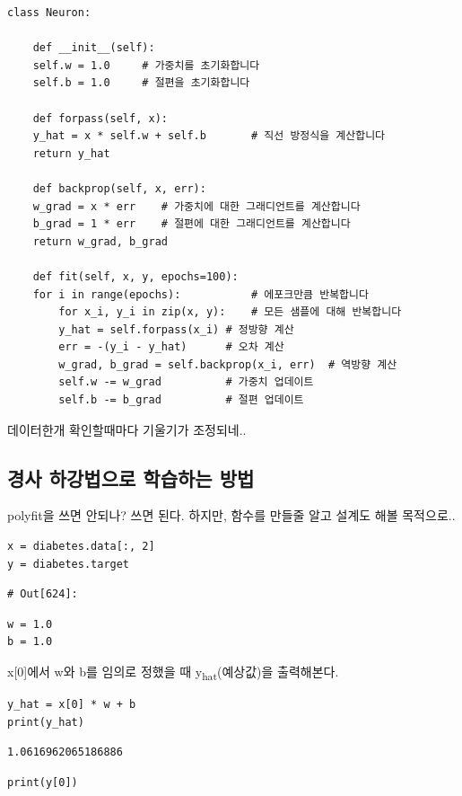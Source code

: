 \documentclass[11pt]{article}
\begin{document}
\begin{enumerate}
\begin{verbatim}
class Neuron:

    def __init__(self):
	self.w = 1.0     # 가중치를 초기화합니다
	self.b = 1.0     # 절편을 초기화합니다

    def forpass(self, x):
	y_hat = x * self.w + self.b       # 직선 방정식을 계산합니다
	return y_hat

    def backprop(self, x, err):
	w_grad = x * err    # 가중치에 대한 그래디언트를 계산합니다
	b_grad = 1 * err    # 절편에 대한 그래디언트를 계산합니다
	return w_grad, b_grad

    def fit(self, x, y, epochs=100):
	for i in range(epochs):           # 에포크만큼 반복합니다
	    for x_i, y_i in zip(x, y):    # 모든 샘플에 대해 반복합니다
		y_hat = self.forpass(x_i) # 정방향 계산
		err = -(y_i - y_hat)      # 오차 계산
		w_grad, b_grad = self.backprop(x_i, err)  # 역방향 계산
		self.w -= w_grad          # 가중치 업데이트
		self.b -= b_grad          # 절편 업데이트
\end{verbatim}

데이터한개 확인할때마다 기울기가 조정되네..
\end{enumerate}

\subsection{경사 하강법으로 학습하는 방법}
\label{sec:org7fd264e}
polyfit을 쓰면 안되나? 쓰면 된다. 하지만, 함수를 만들줄 알고 설계도 해볼 목적으로..
\begin{verbatim}
x = diabetes.data[:, 2]
y = diabetes.target
\end{verbatim}

\begin{verbatim}
# Out[624]:
\end{verbatim}


\begin{verbatim}
w = 1.0
b = 1.0
\end{verbatim}

x[0]에서 w와 b를 임의로 정했을 때 y\textsubscript{hat}(예상값)을 출력해본다.
\begin{verbatim}
y_hat = x[0] * w + b
print(y_hat)
\end{verbatim}

\begin{verbatim}
1.0616962065186886
\end{verbatim}


\begin{verbatim}
print(y[0])
\end{verbatim}
\end{document}
